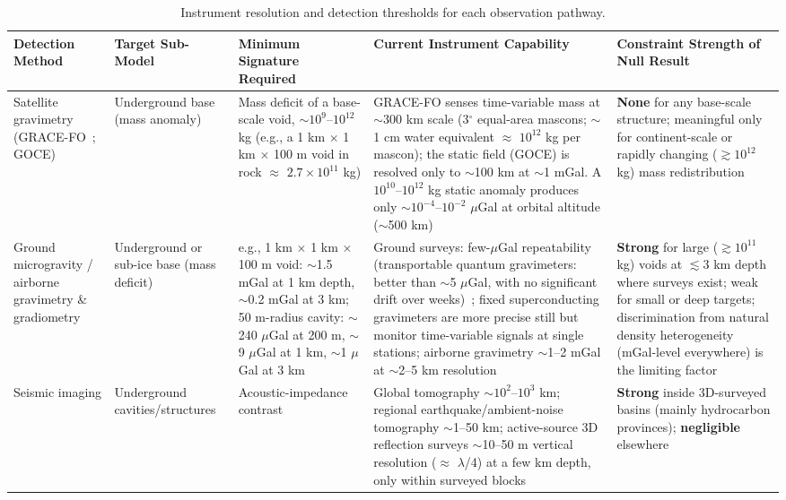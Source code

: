 \documentclass[aps,prd,twocolumn,superscriptaddress,nofootinbib]{revtex4-2}
\begin{document}
\begin{table}[htbp]
\caption{Instrument resolution and detection thresholds for each observation pathway.}
\label{tab:instrument-thresholds}
\footnotesize
\begin{tabular}{P{0.118\textwidth}P{0.106\textwidth}P{0.152\textwidth}P{0.269\textwidth}P{0.202\textwidth}}
\toprule
Detection Method & Target Sub-Model & Minimum Signature Required & Current Instrument Capability & Constraint Strength of Null Result \\
\midrule
Satellite gravimetry (GRACE-FO~\cite{NASA_GRACEFO}; GOCE) & Underground base (mass anomaly) & Mass deficit of a base-scale void, ${\sim}10^{9}$--$10^{12}$ kg (e.g., a 1 km $\times$ 1 km $\times$ 100 m void in rock $\approx$ $2.7\times10^{11}$ kg) & GRACE-FO senses time-variable mass at ${\sim}$300 km scale (3$^{\circ}$ equal-area mascons; ${\sim}$1 cm water equivalent $\approx$ $10^{12}$ kg per mascon); the static field (GOCE) is resolved only to ${\sim}$100 km at ${\sim}$1 mGal. A $10^{10}$--$10^{12}$ kg static anomaly produces only ${\sim}10^{-4}$--$10^{-2}$ $\mu$Gal at orbital altitude (${\sim}$500 km) & \textbf{None} for any base-scale structure; meaningful only for continent-scale or rapidly changing ($\gtrsim10^{12}$ kg) mass redistribution \\
Ground microgravity / airborne gravimetry \& gradiometry & Underground or sub-ice base (mass deficit) & e.g., 1 km $\times$ 1 km $\times$ 100 m void: ${\sim}$1.5 mGal at 1 km depth, ${\sim}$0.2 mGal at 3 km; 50 m-radius cavity: ${\sim}$240 $\mu$Gal at 200 m, ${\sim}$9 $\mu$Gal at 1 km, ${\sim}$1 $\mu$Gal at 3 km & Ground surveys: few-$\mu$Gal repeatability (transportable quantum gravimeters: better than ${\sim}$5 $\mu$Gal, with no significant drift over weeks)~\cite{Cooke2021}; fixed superconducting gravimeters are more precise still but monitor time-variable signals at single stations; airborne gravimetry ${\sim}$1--2 mGal at ${\sim}$2--5 km resolution & \textbf{Strong} for large ($\gtrsim10^{11}$ kg) voids at $\lesssim$3 km depth where surveys exist; weak for small or deep targets; discrimination from natural density heterogeneity (mGal-level everywhere) is the limiting factor \\
Seismic imaging & Underground cavities/structures & Acoustic-impedance contrast & Global tomography ${\sim}10^{2}$--$10^{3}$ km; regional earthquake/ambient-noise tomography ${\sim}$1--50 km; active-source 3D reflection surveys ${\sim}$10--50 m vertical resolution ($\approx$ $\lambda$/4) at a few km depth, only within surveyed blocks & \textbf{Strong} inside 3D-surveyed basins (mainly hydrocarbon provinces); \textbf{negligible} elsewhere \\

\end{tabular}
\end{table}
\end{document}
